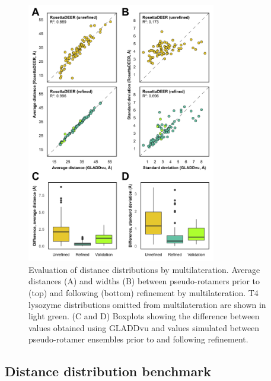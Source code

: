 \begin{figure}
\centering
\includegraphics[width=3.25in]{Figures/multilateration_main_fit.pdf}
 \caption[Evaluation of distance distributions by multilateration.]{Evaluation of distance distributions by multilateration. Average distances (A) and widths (B) between pseudo-rotamers prior to (top) and following (bottom) refinement by multilateration. T4 lysozyme distributions omitted from multilateration are shown in light green. (C and D) Boxplots showing the difference between values obtained using GLADDvu and values simulated between pseudo-rotamer ensembles prior to and following refinement.}
\label{fig:multilateration_main_fit}
\end{figure}

\subsection{Distance distribution benchmark}

